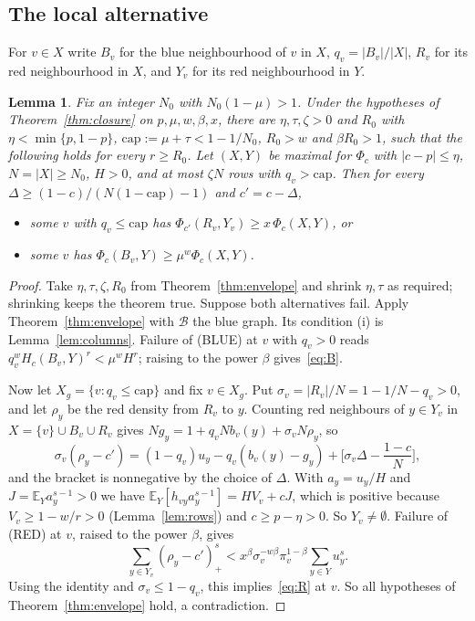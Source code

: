 \documentclass[11pt]{article}
\newtheorem{lemma}[theorem]{Lemma}
\theoremstyle{definition}
\theoremstyle{remark}
\newcommand{\E}{\mathbb{E}}
\begin{document}
\subsection{The local alternative}

For $v\in X$ write $B_v$ for the blue neighbourhood of $v$ in $X$, $q_v=|B_v|/|X|$, $R_v$ for its red neighbourhood in
$X$, and $Y_v$ for its red neighbourhood in $Y$.

\begin{lemma}\label{lem:local}
Fix an integer $N_0$ with $N_0(1-\mu)>1$. Under the hypotheses of Theorem~\ref{thm:closure} on $p,\mu,w,\beta,x$, there
are $\eta,\tau,\zeta>0$ and $R_0$ with $\eta<\min\{p,1-p\}$, $\mathrm{cap}:=\mu+\tau<1-1/N_0$, $R_0>w$ and $\beta R_0>1$,
such that the following holds for every $r\ge R_0$. Let $(X,Y)$ be maximal for $\Phi_c$ with $|c-p|\le\eta$,
$N=|X|\ge N_0$, $H>0$, and at most $\zeta N$ rows with $q_v>\mathrm{cap}$. Then for every
$\Delta\ge(1-c)/(N(1-\mathrm{cap})-1)$ and $c'=c-\Delta$,
\begin{itemize}
\item[(RED)] some $v$ with $q_v\le\mathrm{cap}$ has $\Phi_{c'}(R_v,Y_v)\ge x\,\Phi_c(X,Y)$, or
\item[(BLUE)] some $v$ has $\Phi_c(B_v,Y)\ge\mu^w\Phi_c(X,Y)$.
\end{itemize}
\end{lemma}

\begin{proof}
Take $\eta,\tau,\zeta,R_0$ from Theorem~\ref{thm:envelope} and shrink $\eta,\tau$ as required; shrinking keeps the
theorem true. Suppose both alternatives fail. Apply Theorem~\ref{thm:envelope} with $\mathcal B$ the blue graph. Its
condition (i) is Lemma~\ref{lem:columns}. Failure of (BLUE) at $v$ with $q_v>0$ reads $q_v^wH_c(B_v,Y)^r<\mu^wH^r$; raising
to the power $\beta$ gives~\eqref{eq:B}.

Now let $X_g=\{v:q_v\le\mathrm{cap}\}$ and fix $v\in X_g$. Put $\sigma_v=|R_v|/N=1-1/N-q_v>0$, and let $\rho_y$ be the
red density from $R_v$ to $y$. Counting red neighbours of $y\in Y_v$ in $X=\{v\}\cup B_v\cup R_v$ gives
$Ng_y=1+q_vNb_v(y)+\sigma_vN\rho_y$, so
\[
\sigma_v(\rho_y-c')=(1-q_v)u_y-q_v(b_v(y)-g_y)+\Big[\sigma_v\Delta-\frac{1-c}N\Big],
\]
and the bracket is nonnegative by the choice of $\Delta$. With $a_y=u_y/H$ and $J=\E_Ya_y^{s-1}>0$ we have
$\E_Y[h_{vy}a_y^{s-1}]=HV_v+cJ$, which is positive because $V_v\ge1-w/r>0$ (Lemma~\ref{lem:rows}) and $c\ge p-\eta>0$.
So $Y_v\ne\emptyset$.
Failure of (RED) at $v$, raised to the power $\beta$, gives
\[
\sum_{y\in Y_v}(\rho_y-c')_+^s<x^\beta\sigma_v^{-w\beta}\pi_v^{1-\beta}\sum_{y\in Y}u_y^s.
\]
Using the identity and $\sigma_v\le1-q_v$, this implies~\eqref{eq:R} at $v$. So all hypotheses of
Theorem~\ref{thm:envelope} hold, a contradiction.
\end{proof}
\end{document}
